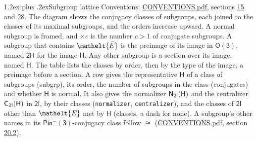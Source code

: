 \documentclass[10pt,a4paper]{article}
\makeatletter
\renewcommand\section{\@startsection{section}{1}{\z@}{-3ex plus -1ex minus -.2ex}%
  {1.2ex plus .2ex}{\normalfont\large\sffamily\bfseries\color{parttitle}}}
\numberwithin{equation}{section}
\newcommand{\eltfont}[1]{{\let\sigma\eltsigma\mathelt{#1}}}
\newcommand{\grp}[1]{\mathsf{#1}}
\newcommand{\cls}[1]{\eltfont{#1}}
\newcommand{\elt}[1]{\eltfont{#1}}
\newcommand{\samecls}{\cong}
\newcommand{\barred}[1]{\bar{#1}}
\newcommand{\hairsp}{\mkern1mu}
\makeatother
\begin{document}
\section{Subgroup lattice}\label{s:subgroups}
Conventions: \href{../../CONVENTIONS.pdf}{CONVENTIONS.pdf}, sections \href{../../../rotation/CONVENTIONS.pdf\#conv.15}{15} and \href{../../CONVENTIONS.pdf\#conv.28}{28}.
The diagram shows the conjugacy classes of subgroups, each joined to the classes of its maximal subgroups, and the orders increase upward. \label{n:index.conjugates.c}\label{n:mark.conjugates}A normal subgroup is framed, and ${\times}c$ is the number $c > 1$ of conjugate subgroups. \label{n:group.H}A subgroup that contains $\elt{\barred{E}}$ is the preimage of its image in $\grp{O(3)}$, named $\grp{2H}$ for the image $\grp{H}$. Any other subgroup is a section over its image, named $\grp{H}$. The table lists the classes by order, then by the type of the image, a preimage before a section. \label{n:head.subgroup}\label{n:head.order}\label{n:head.conjugates}\label{n:head.normal}A row gives the representative $\grp{H}$ of a class of subgroups (subgrp), its order, the number of subgroups in the class (conjugates) and whether $\grp{H}$ is normal. \label{n:group.normalizer}\label{n:group.centralizer}\label{n:head.classes}It also gives the normalizer $\grp{N}_{\hairsp \grp{2I}}(\grp{H})$ and the centralizer $\grp{C}_{\hairsp \grp{2I}}(\grp{H})$ in $\grp{2I}$, by their classes (\texttt{normalizer}, \texttt{centralizer}), and the classes of $\grp{2I}$ other than $\cls{E}$ met by $\grp{H}$ (classes, a dash for none). A subgroup's other names in its \href{Pinminus3.pdf}{$\grp{Pin^{-}(3)}$}-conjugacy class follow $\samecls$ (\href{../../CONVENTIONS.pdf}{CONVENTIONS.pdf}, section \href{../../CONVENTIONS.pdf\#conv.20.2}{20.2}).
\end{document}
